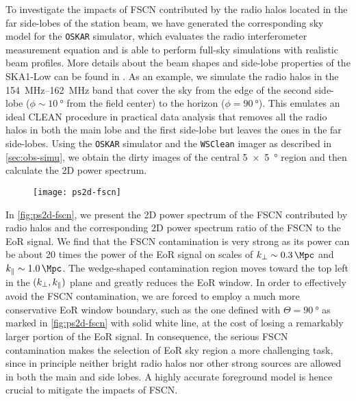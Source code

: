 To investigate the impacts of FSCN contributed by the radio halos
located in the far side-lobes of the station beam, we have generated
the corresponding sky model for the \texttt{OSKAR} simulator,
which evaluates the radio interferometer measurement equation
\cite{smirnov2011} and is able to perform full-sky simulations with
realistic beam profiles.
More details about the beam shapes and side-lobe properties of the
SKA1-Low can be found in .
As an example, we simulate the radio halos in the \SIrange{154}{162}{\MHz}
band that cover the sky from the edge of the second side-lobe
($\phi \sim \SI{10}{\degree}$ from the field center) to the horizon
($\phi = \SI{90}{\degree}$).
This emulates an ideal CLEAN procedure in practical data analysis that
removes all the radio halos in both the main lobe and the first side-lobe
but leaves the ones in the far side-lobes.
Using the \texttt{OSKAR} simulator and the \texttt{WSClean} imager as
described in \autoref{sec:obs-simu}, we obtain the dirty images of the
central \SI{5 x 5}{\degree} region and then
calculate the 2D power spectrum.

\begin{figure}[htp]
  \centering
  \texttt{[image: ps2d-fscn]}
  \label{fig:ps2d-fscn}
\end{figure}

In \autoref{fig:ps2d-fscn}, we present the 2D power spectrum of the FSCN
contributed by radio halos and the corresponding 2D power spectrum ratio
of the FSCN to the EoR signal.
We find that the FSCN contamination is very strong as its power can be
about 20 times the power of the EoR signal on scales of
$\kperp \sim \SI{0.3}{\per\Mpc}$ and $\klos \sim \SI{1.0}{\per\Mpc}$.
The wedge-shaped contamination region moves toward the top left in
the $(k_{\perp}, k_{\parallel})$ plane and greatly reduces the EoR window.
In order to effectively avoid the FSCN contamination, we are forced to
employ a much more conservative EoR window boundary, such as the one
defined with $\Theta = \SI{90}{\degree}$ as marked in
\autoref{fig:ps2d-fscn} with solid white line, at the cost of losing
a remarkably larger portion of the EoR signal.
In consequence,
the serious FSCN contamination makes the selection of EoR sky region
a more challenging task, since in principle neither bright radio halos
nor other strong sources are allowed in both the main and side lobes.
A highly accurate foreground model is hence crucial to mitigate the
impacts of FSCN.


